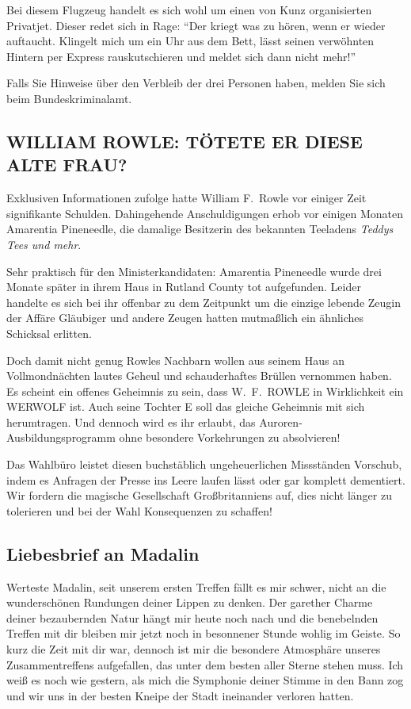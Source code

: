 \documentclass[final]{multiversum}
\begin{document}
Bei diesem Flugzeug handelt es sich wohl um einen von Kunz organisierten
Privatjet. Dieser redet sich in Rage: \enquote{Der kriegt was zu hören, wenn er
wieder auftaucht. Klingelt mich um ein Uhr aus dem Bett, lässt seinen
verwöhnten Hintern per Express rauskutschieren und meldet sich dann nicht mehr!}

Falls Sie Hinweise über den Verbleib der drei Personen haben, melden Sie sich
beim Bundeskriminalamt.

\subsection{WILLIAM ROWLE: TÖTETE ER DIESE ALTE FRAU?}
Exklusiven Informationen zufolge hatte William F.\ Rowle vor einiger Zeit
signifikante Schulden. Dahingehende Anschuldigungen erhob vor einigen Monaten
Amarentia Pineneedle, die damalige Besitzerin des bekannten Teeladens
\emph{Teddys Tees und mehr}.

Sehr praktisch für den Ministerkandidaten: Amarentia Pineneedle wurde drei
Monate später in ihrem Haus in Rutland County tot aufgefunden. Leider handelte
es sich bei ihr offenbar zu dem Zeitpunkt um die einzige lebende Zeugin der
Affäre \textendash{} Gläubiger und andere Zeugen hatten mutmaßlich ein ähnliches
Schicksal erlitten.

Doch damit nicht genug \textendash{} Rowles Nachbarn wollen aus seinem Haus an
Vollmondnächten lautes Geheul und schauderhaftes Brüllen vernommen haben. Es
scheint ein offenes Geheimnis zu sein, dass W.\ F.\ ROWLE in Wirklichkeit ein
WERWOLF ist. Auch seine Tochter E soll das gleiche Geheimnis mit
sich herumtragen. Und dennoch wird es ihr erlaubt, das Auroren-Ausbildungsprogramm
ohne besondere Vorkehrungen zu absolvieren!

Das Wahlbüro leistet diesen buchstäblich ungeheuerlichen Missständen Vorschub,
indem es Anfragen der Presse ins Leere laufen lässt oder gar komplett
dementiert. Wir fordern die magische Gesellschaft Großbritanniens auf, dies
nicht länger zu tolerieren und bei der Wahl Konsequenzen zu schaffen!

\subsection{Liebesbrief an Madalin}
Werteste Madalin, seit unserem ersten Treffen fällt es mir schwer, nicht an die
wunderschönen Rundungen deiner Lippen zu denken.  Der garether Charme deiner
bezaubernden Natur hängt mir heute noch nach und die benebelnden Treffen mit
dir bleiben mir jetzt noch in besonnener Stunde wohlig im Geiste.  So kurz die
Zeit mit dir war, dennoch ist mir die besondere Atmosphäre unseres
Zusammentreffens aufgefallen, das unter dem besten aller Sterne stehen muss. Ich
weiß es noch wie gestern, als mich die Symphonie deiner Stimme in den Bann zog
und wir uns in der besten Kneipe der Stadt ineinander verloren hatten.
\end{document}
